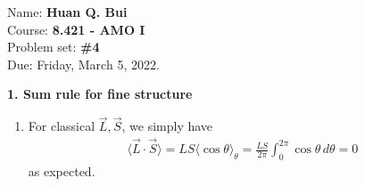 \documentclass{article}
\theoremstyle{definition}
\newcommand{\f}[2]{\frac{#1}{#2}}
\begin{document}
\begin{framed}
\noindent Name: \textbf{Huan Q. Bui}\\
Course: \textbf{8.421 - AMO I}\\
Problem set: \textbf{\#4}\\
Due: Friday, March 5, 2022.
\end{framed}
	
	
\noindent \textbf{1. Sum rule for fine structure}

\begin{enumerate}[label=(\alph*)]
	\item For classical $\vec{L}, \vec{S}$, we simply have
	\begin{align*}
	\langle \vec{L} \cdot \vec{S} \rangle = LS\langle \cos\theta\rangle_\theta = \f{LS}{2\pi} \int_0^{2\pi}\cos\theta\,d\theta = 0
	\end{align*}
	as expected. 
	

\end{enumerate}
\end{document}
